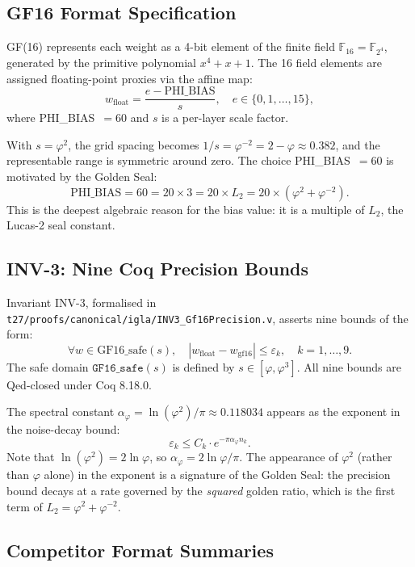\subsection{GF16 Format Specification}

GF(16) represents each weight as a 4-bit element of the
finite field $\mathbb{F}_{16} = \mathbb{F}_{2^4}$, generated
by the primitive polynomial $x^4 + x + 1$.  The 16 field
elements are assigned floating-point proxies via the affine
map:
\[
  w_{\text{float}} = \frac{e - \text{PHI\_BIAS}}{s},
  \quad e \in \{0, 1, \ldots, 15\}, \tag{GS-2}
\]
where PHI\_BIAS~$= 60$ and $s$ is a per-layer scale factor.

With $s = \varphi^2$, the grid spacing becomes
$1/s = \varphi^{-2} = 2 - \varphi \approx 0.382$, and the
representable range is symmetric around zero.  The choice
PHI\_BIAS~$= 60$ is motivated by the Golden Seal:
\[
  \text{PHI\_BIAS} = 60 = 20 \times 3 = 20 \times L_2
  = 20 \times (\varphi^2 + \varphi^{-2}).
\]
This is the deepest algebraic reason for the bias value: it
is a multiple of $L_2$, the Lucas-2 seal constant.

\subsection{INV-3: Nine Coq Precision Bounds}

Invariant INV-3, formalised in
\texttt{t27/proofs/canonical/igla/INV3\_Gf16Precision.v},
asserts nine bounds of the form:
\[
  \forall w \in \text{GF16\_safe}(s),\quad
  |w_{\text{float}} - w_{\text{gf16}}| \leq \varepsilon_k,
  \quad k = 1, \ldots, 9. \tag{GS-3}
\]
The safe domain $\texttt{GF16\_safe}(s)$ is defined by
$s \in [\varphi, \varphi^3]$.  All nine bounds are
Qed-closed under Coq 8.18.0.

The spectral constant
$\alpha_\varphi = \ln(\varphi^2)/\pi \approx 0.118034$
appears as the exponent in the noise-decay bound:
\[
  \varepsilon_k \leq C_k \cdot e^{-\pi \alpha_\varphi n_k}.
\]
Note that $\ln(\varphi^2) = 2\ln\varphi$, so
$\alpha_\varphi = 2\ln\varphi/\pi$.  The appearance of
$\varphi^2$ (rather than $\varphi$ alone) in the exponent is
a signature of the Golden Seal: the precision bound decays
at a rate governed by the \emph{squared} golden ratio,
which is the first term of $L_2 = \varphi^2 + \varphi^{-2}$.


\subsection{Competitor Format Summaries}

